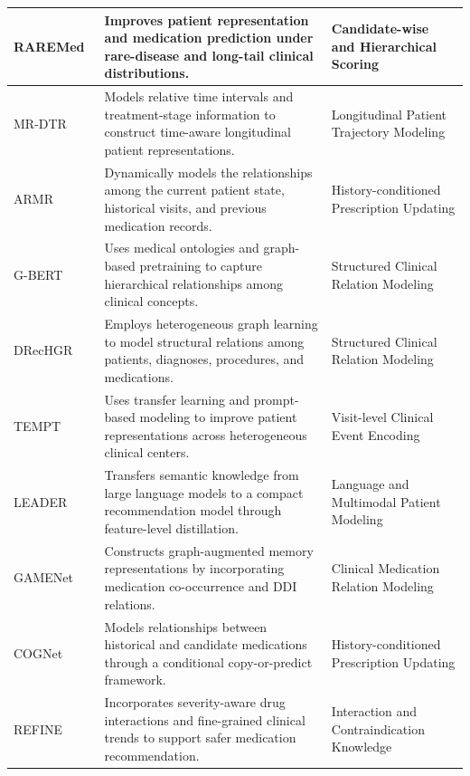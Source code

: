 \documentclass[manuscript,review]{acmart}
\begin{document}
\begin{longtable}{
    @{}
    L{0.13\textwidth}
    L{0.54\textwidth}
    L{0.27\textwidth}
    @{}
}
RAREMed~\cite{zhao2024raremed} &
Improves patient representation and medication prediction under rare-disease and long-tail clinical distributions. &
Candidate-wise and Hierarchical Scoring \\
\hline

MR-DTR~\cite{li2025mrdtr} &
Models relative time intervals and treatment-stage information to construct time-aware longitudinal patient representations. &
Longitudinal Patient Trajectory Modeling \\
\hline

ARMR~\cite{wu2025armr} &
Dynamically models the relationships among the current patient state, historical visits, and previous medication records. &
History-conditioned Prescription Updating \\
\hline

G-BERT~\cite{shang2019gbert} &
Uses medical ontologies and graph-based pretraining to capture hierarchical relationships among clinical concepts. &
Structured Clinical Relation Modeling \\
\hline

DRecHGR~\cite{zhang2024drechgr} &
Employs heterogeneous graph learning to model structural relations among patients, diagnoses, procedures, and medications. &
Structured Clinical Relation Modeling \\
\hline

TEMPT~\cite{liu2025tempt} &
Uses transfer learning and prompt-based modeling to improve patient representations across heterogeneous clinical centers. &
Visit-level Clinical Event Encoding \\
\hline

LEADER~\cite{liu2024leader} &
Transfers semantic knowledge from large language models to a compact recommendation model through feature-level distillation. &
Language and Multimodal Patient Modeling \\
\hline

GAMENet~\cite{shang2019gamenet} &
Constructs graph-augmented memory representations by incorporating medication co-occurrence and DDI relations. &
Clinical Medication Relation Modeling \\
\hline

COGNet~\cite{wu2022cognet} &
Models relationships between historical and candidate medications through a conditional copy-or-predict framework. &
History-conditioned Prescription Updating \\
\hline

REFINE~\cite{bhoi2023refine} &
Incorporates severity-aware drug interactions and fine-grained clinical trends to support safer medication recommendation. &
Interaction and Contraindication Knowledge \\
\hline


\end{longtable}
\end{document}
